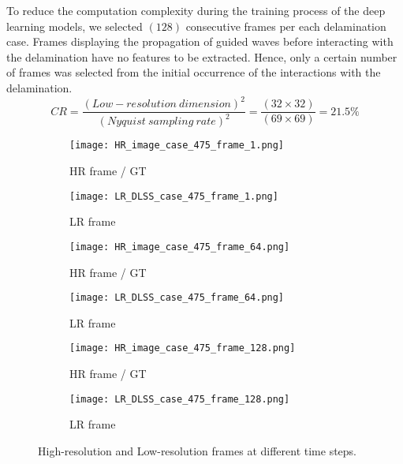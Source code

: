 To reduce the computation complexity during the training process of the deep learning models, we selected \((128)\) consecutive frames per each delamination case.
Frames displaying the propagation of guided waves before interacting with the delamination have no features to be extracted. 
Hence, only a certain number of frames was selected from the initial occurrence of the interactions with the delamination.
\begin{equation}
	CR = \frac{(Low-resolution\ dimension)^2}{(Nyquist\ sampling\ rate)^2} = \frac{(32\times32)}{(69\times69)}=21.5\%
	\label{CR}
\end{equation}
\begin{figure} [!h]
	\centering
	\begin{subfigure}[b]{.48\textwidth}
		\centering
	\texttt{[image: HR\_image\_case\_475\_frame\_1.png]}
		\caption{HR frame / GT}
		\label{fig:SR_1}
	\end{subfigure}
	\hfill
	\begin{subfigure}[b]{.48\textwidth}
		\centering
		\texttt{[image: LR\_DLSS\_case\_475\_frame\_1.png]}
		\caption{LR frame}
		\label{fig:LR_1}	
	\end{subfigure}
	\hfill
		\begin{subfigure}[b]{.48\textwidth}
		\centering
		\texttt{[image: HR\_image\_case\_475\_frame\_64.png]}
		\caption{HR frame / GT}
		\label{fig:SR_2}
	\end{subfigure}
	\hfill
	\begin{subfigure}[b]{.48\textwidth}
		\centering
		\texttt{[image: LR\_DLSS\_case\_475\_frame\_64.png]}
		\caption{LR frame}
		\label{fig:LR_2}	
	\end{subfigure}
	\hfill
		\begin{subfigure}[b]{.48\textwidth}
		\centering
		\texttt{[image: HR\_image\_case\_475\_frame\_128.png]}
		\caption{HR frame / GT}
		\label{fig:SR_3}
	\end{subfigure}
	\hfill
	\begin{subfigure}[b]{.48\textwidth}
		\centering
		\texttt{[image: LR\_DLSS\_case\_475\_frame\_128.png]}
		\caption{LR frame}
		\label{fig:LR_3}	
	\end{subfigure}
	\caption{High-resolution and Low-resolution frames at different time steps.}
	\label{fig:SR_LR}
\end{figure}
\newpage